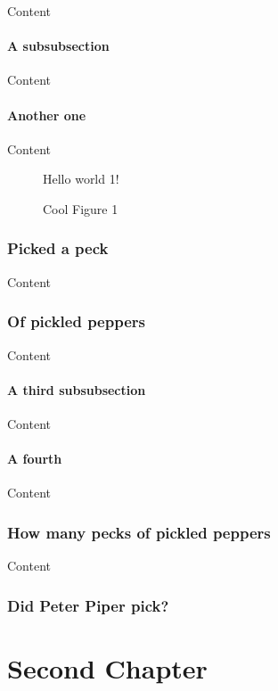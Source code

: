 \documentclass{book}
\begin{document}
Content

\subsubsection{A subsubsection}

Content

\subsubsection{Another one}

Content

\begin{figure}[htb]
\begin{center}
Hello world 1!
\end{center}
\caption{Cool Figure 1}
\end{figure}


\subsection{Picked a peck}

Content

\subsection{Of pickled peppers}

Content

\subsubsection{A third subsubsection}

Content

\subsubsection{A fourth}

Content

\subsection[How many pecks]{How many pecks of pickled peppers}

Content

\subsection{Did Peter Piper pick?}

\chapter{Second Chapter}
\end{document}
